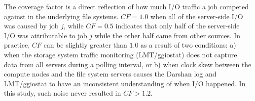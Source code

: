 The coverage factor is a direct reflection of how much I/O traffic a job competed against in the underlying file systems.
$\mathit{CF} = 1.0$ when all of the server-side I/O was caused by job $j$, while $\mathit{CF} = 0.5$ indicates that only half of the server-side I/O was attributable to job $j$ while the other half came from other sources.
In practice, $\mathit{CF}$ can be slightly greater than $1.0$ as a result of two conditions:
a) when the storage system traffic monitoring (LMT/ggiostat) does not capture data from all servers during a polling interval, or
b) when clock skew between the compute nodes and the file system servers causes the Darshan log and LMT/ggiostat to have an inconsistent understanding of when I/O happened.
In this study, such noise never resulted in $\mathit{CF} > 1.2$.



